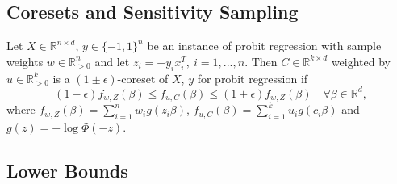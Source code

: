 \subsection{Coresets and Sensitivity Sampling}

\begin{definition}
    Let $X \in \mathbb{R}^{n \times d}$, $y \in \{-1, 1\}^n$ be an
    instance of probit regression with sample weights
    $w \in \mathbb{R}^n_{>0}$ and let $z_i = -y_ix_i^T, \ i=1,...,n$.
    Then $C \in \mathbb{R}^{k \times d}$ weighted
    by $u \in \mathbb{R}^k_{>0}$ is a $(1 \pm \epsilon)$-coreset
    of $X$, $y$ for probit regression if
    \begin{equation*}
        \ (1 - \epsilon)f_{w, Z}(\beta)
        \leq f_{u, C}(\beta) \leq (1 + \epsilon)f_{w, Z}(\beta)
        \quad \forall \beta \in \mathbb{R}^d,
    \end{equation*}
    where $f_{w, Z}(\beta) = \sum_{i=1}^n w_i g(z_i \beta)$,
    $f_{u, C}(\beta) = \sum_{i=1}^k u_i g(c_i \beta)$ and
    $g(z) = -\log{\Phi(-z)}$.
\end{definition}

\subsection{Lower Bounds}

